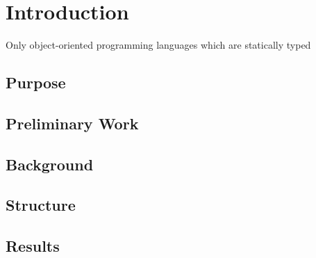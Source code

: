 \chapter{Introduction}
Only object-oriented programming languages which are statically typed

\section{Purpose}


\section{Preliminary Work}

\section{Background}

\section{Structure}

\section{Results}
